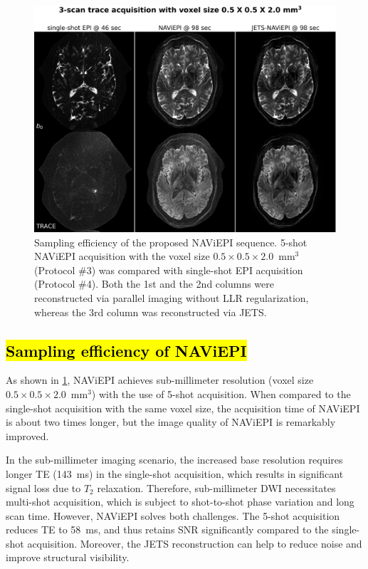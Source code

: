 \documentclass[preprint,12pt,authoryear,review]{elsarticle}
\begin{document}
    \begin{figure}
        \centering
        \includegraphics[width=\textwidth]{../figures/fig7.png}
        \caption{Sampling efficiency of the proposed NAViEPI sequence.
        5-shot NAViEPI acquisition with the voxel size
        $0.5\times0.5\times2.0$~mm$^3$ (Protocol \#3)
        was compared with single-shot EPI acquisition (Protocol \#4).
        Both the 1st and the 2nd columns were reconstructed
        via parallel imaging without LLR regularization,
        whereas the 3rd column was reconstructed via JETS.}
        \label{FIG:0.5mm_shots}
    \end{figure}

    \subsection{\hl{Sampling efficiency of NAViEPI}}

    As shown in \cref{FIG:0.5mm_shots},
    NAViEPI achieves sub-millimeter resolution
    (voxel size $0.5\times0.5\times2.0$~mm$^3$)
    with the use of 5-shot acquisition.
    When compared to the single-shot acquisition
    with the same voxel size,
    the acquisition time of NAViEPI is about two times longer,
    but the image quality of NAViEPI is remarkably improved.

    In the sub-millimeter imaging scenario,
    the increased base resolution requires longer TE (\SI{143}{\ms})
    in the single-shot acquisition,
    which results in significant signal loss due to $T_2$ relaxation.
    Therefore, sub-millimeter DWI necessitates multi-shot acquisition,
    which is subject to shot-to-shot phase variation and long scan time.
    However, NAViEPI solves both challenges.
    The 5-shot acquisition reduces TE to \SI{58}{\ms},
    and thus retains SNR significantly
    compared to the single-shot acquisition.
    Moreover, the JETS reconstruction can help to reduce noise
    and improve structural visibility.
\end{document}
